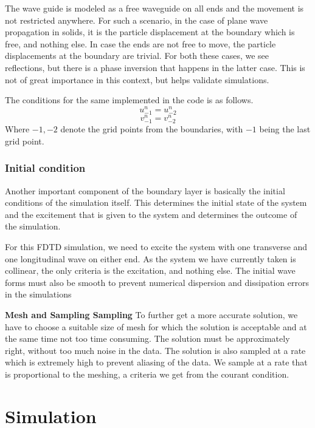 The wave guide is modeled as a free waveguide on all ends and the movement is not restricted anywhere. For such a scenario, in the case of plane wave propagation in solids, it is the particle displacement at the boundary which is free, and nothing else. In case the ends are not free to move, the particle displacements at the boundary are trivial. For both these cases, we see reflections, but there is a phase inversion that happens in the latter case. This is not of great importance in this context, but helps validate simulations.

The conditions for the same implemented in the code is as follows.
\begin{equation}
u^n_{-1} = u^n_{-2}
\end{equation}
\begin{equation}
v^n_{-1} = v^n_{-2}
\end{equation}
Where $-1, -2$ denote the grid points from the boundaries, with $-1$ being the last grid point.
\subsubsection{Initial condition}
Another important component of the boundary layer is basically the initial conditions of the simulation itself. This determines the initial state of the system and the excitement that is given to the system and determines the outcome of the simulation. 

For this FDTD simulation, we need to excite the system with one transverse and one longitudinal wave on either end. As the system we have currently taken is collinear, the only criteria is the excitation, and nothing else. The initial wave forms must also be smooth\cite{smoothness} to prevent numerical dispersion and dissipation errors in the simulations \cite{errors} \cite{errors_2}

\textbf{Mesh and Sampling Sampling}
To further get a more accurate solution, we have to choose a suitable size of mesh for which the solution is acceptable and at the same time not too time consuming. The solution must be approximately right, without too much noise in the data. The solution is also sampled at a rate which is extremely high to prevent aliasing of the data. We sample at a rate that is proportional to the meshing, a criteria we get from the courant condition.

\section{Simulation}
